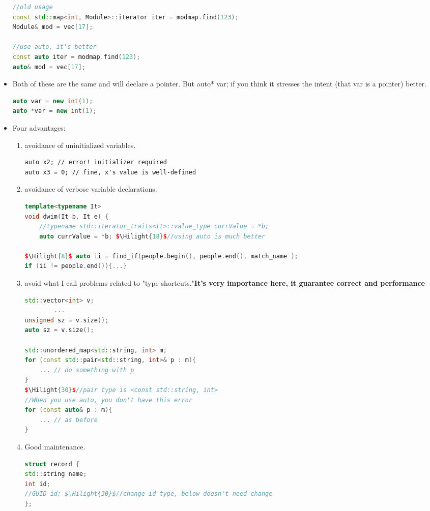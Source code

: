 \documentclass[a4paper,11pt,twoside]{book}
\newcommand{\Hilight}[1]{\makebox[0pt][l]{\color{yellow}\rule[-3pt]{#1em}{11pt}}}
\newcommand{\Hilight}[1]{}
\begin{document}
\begin{itemize}
\begin{lstlisting}[frame=single, language=c++]
//old usage
const std::map<int, Module>::iterator iter = modmap.find(123);
Module& mod = vec[17];

//use auto, it's better
const auto iter = modmap.find(123);
auto& mod = vec[17];
\end{lstlisting}
	
	\item Both of these are the same and will declare a pointer. But auto* var; if you think it stresses the intent (that var is a pointer) better.
\begin{lstlisting}[frame=single, language=c++]
auto var = new int(1);
auto *var = new int(1);
\end{lstlisting}


	\item Four advantages:
	\begin{enumerate}
		\item avoidance of uninitialized variables.
\begin{lstlisting}
auto x2; // error! initializer required
auto x3 = 0; // fine, x's value is well-defined
\end{lstlisting}
		\item avoidance of verbose variable declarations.
\begin{lstlisting}[frame=single, language=c++]
template<typename It>
void dwim(It b, It e) {
	//typename std::iterator_traits<It>::value_type currValue = *b;
	auto currValue = *b; $\Hilight{18}$//using auto is much better
	
$\Hilight{8}$ auto ii = find_if(people.begin(), people.end(), match_name );
if (ii != people.end()){...}
\end{lstlisting}

		\item avoid what I call problems related to "type shortcuts."\textbf{It's very importance here, it guarantee correct and performance}
\begin{lstlisting}[frame=single, language=c++]
std::vector<int> v;
		...
unsigned sz = v.size();
auto sz = v.size();
		
std::unordered_map<std::string, int> m;
for (const std::pair<std::string, int>& p : m){
	... // do something with p
}
$\Hilight{30}$//pair type is <const std::string, int>
//When you use auto, you don't have this error
for (const auto& p : m){
	... // as before
}
\end{lstlisting}
	\item Good maintenance.
\begin{lstlisting}[frame=single, language=c++, mathescape=true]
struct record {
std::string name;
int id;
//GUID id; $\Hilight{30}$//change id type, below doesn't need change
};


\end{lstlisting}
\end{enumerate}
\end{itemize}
\end{document}
